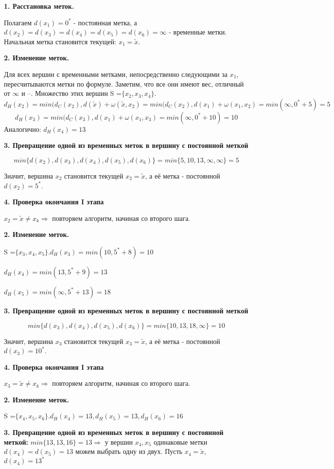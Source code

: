 \documentclass[12pt, a4paper, oneside]{article}
\theoremstyle{plain} %
\theoremstyle{definition}
\begin{document}
\textbf{1. Расстановка меток.}

Полагаем $d(x_1) = 0^*$ - постоянная метка, а
$d(x_2) = d(x_3) = d(x_4) = d(x_5) = d(x_6) = \infty$ - временные метки. Начальная метка становится текущей: $x_1 = \tilde x$.

\textbf{2. Изменение меток.}

Для всех вершин с временными метками, непосредственно следующими за $x_1$, пересчитываются метки по формуле. Заметим, что все они имеют вес, отличный от $\infty$ и --.
Множество этих вершин S =$\{ x_2, x_3, x_4 \}$.
\[ d_H(x_2) = min(d_C(x_2), d(\tilde x) + \omega(\tilde x, x_2 ) = min(d_C(x_2), d(x_1) + \omega(x_1, x_2 ) = min(\infty, 0^* + 5 ) = 5  \]
\[ d_H(x_3) = min(d_C(x_3), d(x_1) + \omega(x_1, x_3 ) = min(\infty, 0^* + 10 ) = 10  \]
Аналогично: $d_H(x_4) = 13$

\textbf{3. Превращение одной из временных меток в вершину с постоянной меткой }

\[ min\{d(x_2),d(x_3),d(x_4),d(x_5),d(x_6)\} = min\{5,10,13,\infty,\infty\} = 5 \]

Значит, вершина $x_2$ становится текущей $x_2 = \tilde x$, а её метка - постоянной $d(x_2) = 5^*$.

\textbf{4. Проверка окончания I этапа }

$x_2 = \tilde x \neq x_k \Rightarrow$ повторяем алгоритм, начиная со второго шага.

\textbf{2. Изменение меток.} 

S =$\{ x_3, x_4, x_5 \}. d_H(x_3) = min(10, 5^* + 8 ) = 10 $

$d_H(x_4) = min(13, 5^* + 9 ) = 13$

$d_H(x_5) = min(\infty, 5^* + 13 ) = 18$

\textbf{3. Превращение одной из временных меток в вершину с постоянной меткой }

\[ min\{d(x_3),d(x_4),d(x_5),d(x_6)\} = min\{10,13,18,\infty\} = 10 \]

Значит, вершина $x_3$ становится текущей $x_3 = \tilde x$, а её метка - постоянной $d(x_3) = 10^*$.

\textbf{4. Проверка окончания I этапа }

$x_3 = \tilde x \neq x_k \Rightarrow$ повторяем алгоритм, начиная со второго шага.

\textbf{2. Изменение меток.} 

S =$\{ x_4, x_5, x_6 \}. d_H(x_4) = 13, d_H(x_5) = 13, d_H(x_6) = 16$

\textbf{3. Превращение одной из временных меток в вершину с постоянной меткой: }
$min\{13,13,16\} = 13 \Rightarrow$ у вершин $x_4, x_5$ одинаковые метки $d(x_4)=d(x_5)=13$ можем выбрать одну из двух. Пусть $x_4 = \tilde x$, $d(x_4) = 13^*$
\end{document}
